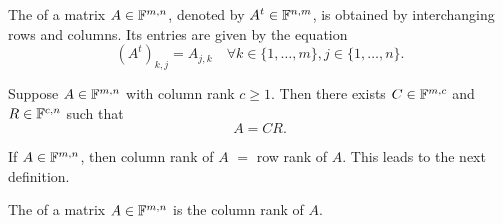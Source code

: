 \setcounter{thm}{53}
\begin{mydef}[transpose, $A^t$]
  \label{def: transpose}
  The  of a matrix $A\in \mathbb{F}^{m,n}$, denoted by $A^t\in \mathbb{F}^{n,m}$, is obtained by interchanging rows and columns. Its entries are given by the equation
  \begin{equation}
    \left( A^{t} \right)_{k,j} = A_{j,k} \quad \forall k \in \{1, \ldots, m\}, j \in \{1, \ldots, n\}.
  \end{equation}
\end{mydef}

\setcounter{thm}{55}
\begin{thm}
  Suppose $A \in \mathbb{F}^{m,n}$ with column rank $c \geq 1.$ Then there exists $C\in \mathbb{F}^{m,c}$ and $R\in \mathbb{F}^{c,n}$ such that
  \begin{equation}
    A = CR.
  \end{equation}
\end{thm}

\begin{thm}
  If $A\in \mathbb{F}^{m,n}$, then column rank of $A$ $=$ row rank of $A$. This leads to the next definition.
\end{thm}

\begin{mydef} [rank]
  The  of a matrix $A \in  \mathbb{F}^{m,n}$ is the column rank of $A$.
\end{mydef}